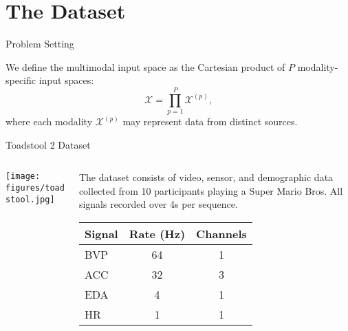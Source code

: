 \section{The Dataset}

\begin{frame}{Problem Setting}
	\begin{block}{}
		We define the multimodal input space as the Cartesian product of $P$ modality-specific input spaces:
		\[
		\mathcal{X} = \prod_{p=1}^{P} \mathcal{X}^{(p)},
		\]
		where each modality $\mathcal{X}^{(p)}$ may represent data from distinct sources.
	\end{block}
	
\end{frame}



\begin{frame}{Toadstool 2 Dataset}
		\begin{columns}[T] %
		\begin{column}{0.4\textwidth}
			\texttt{[image: figures/toadstool.jpg]}
			
		\end{column}
		\begin{column}{0.6\textwidth}
			\begin{block}{}
				The dataset consists of video, sensor, and demographic data collected from 10 participants playing a Super Mario Bros. All signals recorded over 4s per sequence.
			\end{block}

		\vspace{0.5em}
		\centering
		\begin{tabular}{lcc}
		\toprule
		\textbf{Signal} & \textbf{Rate (Hz)} & \textbf{Channels} \\
		\midrule
		BVP  & 64 & 1      \\
		ACC  & 32 & 3 		\\
		EDA  & 4  & 1      \\
		HR   & 1  & 1      \\
		\bottomrule
		\end{tabular}


		\end{column}
	\end{columns}
\end{frame}


